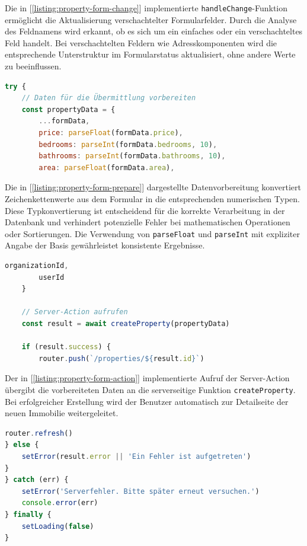 						
						Die in [\ref{listing:property-form-change}] implementierte \texttt{handleChange}-Funktion ermöglicht die Aktualisierung verschachtelter Formularfelder. Durch die Analyse des Feldnamens wird erkannt, ob es sich um ein einfaches oder ein verschachteltes Feld handelt. Bei verschachtelten Feldern wie Adresskomponenten wird die entsprechende Unterstruktur im Formularstatus aktualisiert, ohne andere Werte zu beeinflussen.
						
						
\begin{lstlisting}[language=JavaScript, caption={Datenvorbereitung für die Übermittlung.}, label={listing:property-form-prepare}]
try {
	// Daten für die Übermittlung vorbereiten
	const propertyData = {
		...formData,
		price: parseFloat(formData.price),
		bedrooms: parseInt(formData.bedrooms, 10),
		bathrooms: parseInt(formData.bathrooms, 10),
		area: parseFloat(formData.area),
\end{lstlisting}

								
								Die in [\ref{listing:property-form-prepare}] dargestellte Datenvorbereitung konvertiert Zeichenkettenwerte aus dem Formular in die entsprechenden numerischen Typen. Diese Typkonvertierung ist entscheidend für die korrekte Verarbeitung in der Datenbank und verhindert potenzielle Fehler bei mathematischen Operationen oder Sortierungen. Die Verwendung von \texttt{parseFloat} und \texttt{parseInt} mit expliziter Angabe der Basis gewährleistet konsistente Ergebnisse.
\begin{lstlisting}[language=JavaScript, caption={Aufruf der Server-Action.}, label={listing:property-form-action}]
        organizationId,
        userId
    }

	// Server-Action aufrufen
	const result = await createProperty(propertyData)

	if (result.success) {
		router.push(`/properties/${result.id}`)
\end{lstlisting}

								
								Der in [\ref{listing:property-form-action}] implementierte Aufruf der Server-Action übergibt die vorbereiteten Daten an die serverseitige Funktion \texttt{createProperty}. Bei erfolgreicher Erstellung wird der Benutzer automatisch zur Detailseite der neuen Immobilie weitergeleitet.
								
\begin{lstlisting}[language=JavaScript, caption={Fehlerbehandlung bei der Formularübermittlung.}, label={listing:property-form-error}]
	router.refresh()
} else {
	setError(result.error || 'Ein Fehler ist aufgetreten')
}
} catch (err) {
	setError('Serverfehler. Bitte später erneut versuchen.')
	console.error(err)
} finally {
	setLoading(false)
}
\end{lstlisting}

